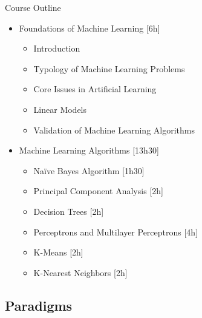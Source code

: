 \begin{frame}{Course Outline}
	\begin{itemize}
		\item Foundations of Machine Learning [6h]
		\begin{itemize}
			\item Introduction
			\item Typology of Machine Learning Problems
			\item Core Issues in Artificial Learning
			\item Linear Models
			\item Validation of Machine Learning Algorithms
		\end{itemize}
		\item Machine Learning Algorithms [13h30]
		\begin{itemize}
			\item Naïve Bayes Algorithm [1h30]
			\item Principal Component Analysis [2h]
			\item Decision Trees [2h]
			\item Perceptrons and Multilayer Perceptrons [4h]
			\item K-Means [2h]
			\item K-Nearest Neighbors [2h]
		\end{itemize}
	\end{itemize}
\end{frame}

\subsection[Paradigms]{Paradigms}

